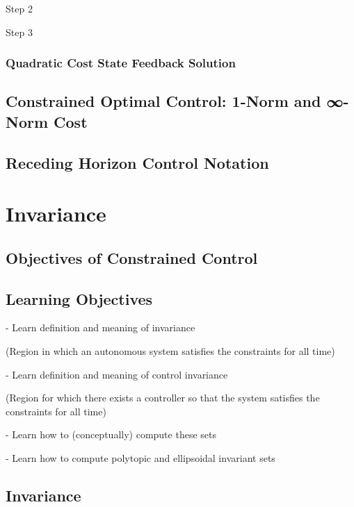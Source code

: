 Step 2

Step 3


\subsubsection{Quadratic Cost State Feedback Solution}



\subsection{Constrained Optimal Control: 1-Norm and ∞-Norm Cost}


\subsection{Receding Horizon Control Notation}



\section{Invariance}

\subsection{Objectives of Constrained Control}


\subsection{Learning Objectives}

- Learn definition and meaning of invariance

(Region in which an autonomous system satisfies the constraints for all time)

- Learn definition and meaning of control invariance

(Region for which there exists a controller so that the system satisfies the constraints for all time)

- Learn how to (conceptually) compute these sets

- Learn how to compute polytopic and ellipsoidal invariant sets

\subsection{Invariance}

